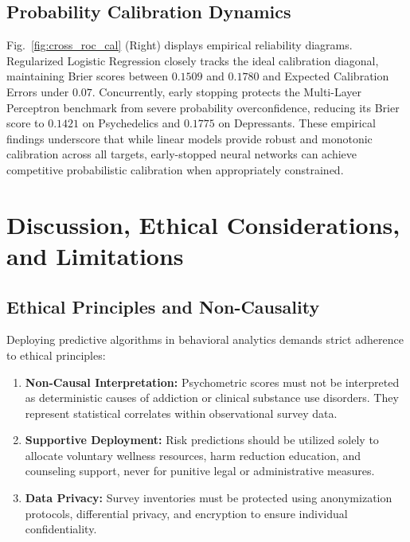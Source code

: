 \documentclass[conference]{IEEEtran}
\begin{document}
\subsection{Probability Calibration Dynamics}
Fig.~\ref{fig:cross_roc_cal} (Right) displays empirical reliability diagrams. Regularized Logistic Regression closely tracks the ideal calibration diagonal, maintaining Brier scores between $0.1509$ and $0.1780$ and Expected Calibration Errors under $0.07$. Concurrently, early stopping protects the Multi-Layer Perceptron benchmark from severe probability overconfidence, reducing its Brier score to $0.1421$ on Psychedelics and $0.1775$ on Depressants. These empirical findings underscore that while linear models provide robust and monotonic calibration across all targets, early-stopped neural networks can achieve competitive probabilistic calibration when appropriately constrained.

\section{Discussion, Ethical Considerations, and Limitations}

\subsection{Ethical Principles and Non-Causality}
Deploying predictive algorithms in behavioral analytics demands strict adherence to ethical principles:
\begin{enumerate}
    \item \textbf{Non-Causal Interpretation:} Psychometric scores must not be interpreted as deterministic causes of addiction or clinical substance use disorders. They represent statistical correlates within observational survey data.
    \item \textbf{Supportive Deployment:} Risk predictions should be utilized solely to allocate voluntary wellness resources, harm reduction education, and counseling support, never for punitive legal or administrative measures.
    \item \textbf{Data Privacy:} Survey inventories must be protected using anonymization protocols, differential privacy, and encryption to ensure individual confidentiality.
\end{enumerate}
\end{document}

